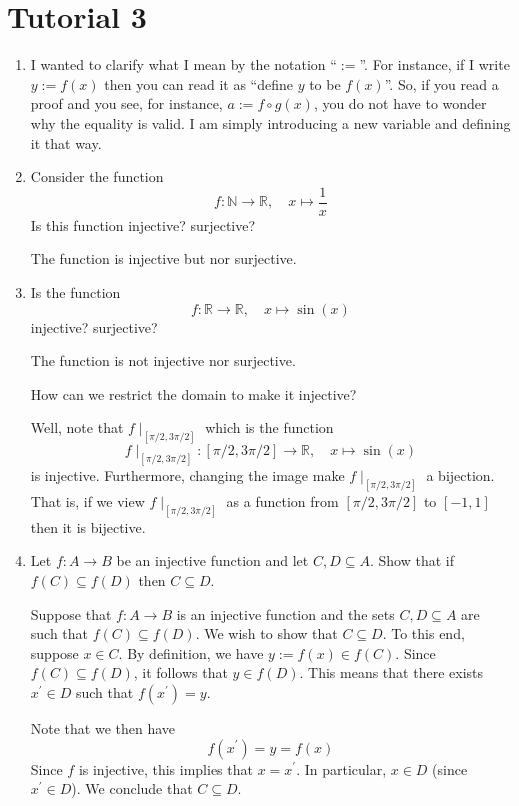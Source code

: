 \documentclass[12pt, reqno]{article}
\numberwithin{equation}{section}
\theoremstyle{definition}
\theoremstyle{remark}
\newcommand{\NN}{\mathbb{N}}
\newcommand{\RR}{\mathbb{R}}
\begin{document}
\section*{Tutorial 3}

\begin{enumerate}[leftmargin=*]
	\item I wanted to clarify what I mean by the notation ``$:=$''. For instance, if I write $y:= f(x)$ then you can read it as ``define $y$ to be $f(x)$''. So, if you read a proof and you see, for instance, $a:=f\circ g(x)$, you do not have to wonder why the equality is valid. I am simply introducing a new variable and defining it that way.
	\item Consider the function
	      \[
		      f: \NN\to \RR,\quad x\mapsto \frac{1}{x}
	      \]
	      Is this function injective? surjective?

	      The function is injective but nor surjective.

	\item Is the function
	      \[
		      f: \RR\to\RR, \quad x\mapsto\sin(x)
	      \]
	      injective? surjective?

	      The function is not injective nor surjective.

	      How can we restrict the domain to make it injective?

	      Well, note that $f\mid_{[\pi/2, 3\pi/2]}$ which is the function
	      \[
		      f\mid_{[\pi/2, 3\pi/2]}: [\pi/2, 3\pi/2]\to\RR, \quad x\mapsto\sin(x)
	      \]
	      is injective. Furthermore, changing the image make $f\mid_{[\pi/2, 3\pi/2]}$ a bijection. That is, if we view $f\mid_{[\pi/2, 3\pi/2]}$ as a function from $[\pi/2, 3\pi/2]$ to $[-1,1]$ then it is bijective.

	\item Let $f:A\to B$ be an injective function and let $C, D \subseteq A$. Show that if $f(C)\subseteq f(D)$ then $C\subseteq D$.

	      Suppose that $f:A\to B$ is an injective function and the sets $C, D \subseteq A$ are such that $f(C)\subseteq f(D)$. We wish to show that $C\subseteq D$. To this end, suppose $x \in C$. By definition, we have $y:= f(x) \in f(C)$. Since $f(C)\subseteq f(D)$, it follows that $y\in f(D)$. This means that there exists $x^\prime \in D$ such that $f(x^\prime) = y$.

	      Note that we then have
	      \[
		      f(x^\prime) = y = f(x)
	      \]
	      Since $f$ is injective, this implies that $x = x^\prime$. In particular, $x\in D$ (since $x^\prime \in D$). We conclude that $C\subseteq D$.


\end{enumerate}
\end{document}
